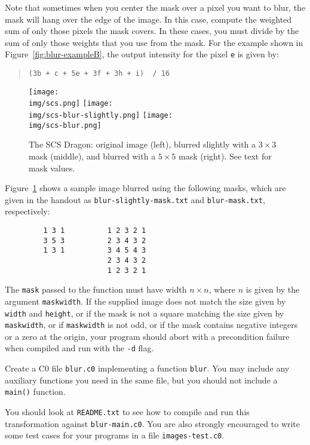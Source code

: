 Note that sometimes when you center the mask over a pixel you want to
blur, the mask will hang over the edge of the image. In this case,
compute the weighted sum of only those pixels the mask covers. In
these cases, you must divide by the sum of only those weights that you
use from the mask. For the example shown in
Figure~\ref{fig:blur-exampleB}, the output intensity for the pixel
\lstinline'e' is given by:
\begin{quote}
\begin{lstlisting}
(3b + c + 5e + 3f + 3h + i)  / 16
\end{lstlisting}
\end{quote}

\begin{figure}[b]
\centering
\texttt{[image: \\img/scs.png]}
\quad
\texttt{[image: \\img/scs-blur-slightly.png]}
\quad
\texttt{[image: \\img/scs-blur.png]}
\caption{The SCS Dragon: original image (left), blurred slightly with
  a $3 \times 3$ mask (middle), and blurred with a $5 \times 5$ mask
  (right). See text for mask values.}
\label{fig:carnegie-blur}
\end{figure}


Figure~\ref{fig:carnegie-blur} shows a sample image blurred using the
following masks, which are given in the handout as
\lstinline'blur-slightly-mask.txt' and \lstinline'blur-mask.txt',
respectively:
\begin{verbatim}
         1 3 1          1 2 3 2 1
         3 5 3          2 3 4 3 2
         1 3 1          3 4 5 4 3
                        2 3 4 3 2
                        1 2 3 2 1
\end{verbatim}

The \lstinline'mask' passed to the function must have width $n \times
n$, where $n$ is given by the argument \lstinline'maskwidth'.  If the
supplied image does not match the size given by \lstinline'width' and
\lstinline'height', or if the mask is not a square matching the size
given by \lstinline'maskwidth', or if \lstinline'maskwidth' is not
odd, or if the mask contains negative integers or a zero at the
origin, your program should abort with a precondition failure when
compiled and run with the \lstinline'-d' flag.

\begin{task}[10]
Create a C0 file \lstinline'blur.c0' implementing a function
\lstinline'blur'. You may include any auxiliary functions you need in the
same file, but you should not include a \lstinline'main()' function.
\end{task}

You should look at \lstinline'README.txt' to see how to compile and run
this transformation against \lstinline'blur-main.c0'. You are also strongly
encouraged to write some test cases for your programs in a
file \lstinline'images-test.c0'.



